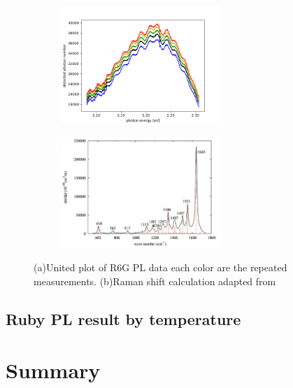 \documentclass{article}
\begin{document}
 \begin{figure}[ht]
  \centering
  \begin{subfigure}[b]{6cm}
      \centering
      \includegraphics[width=6cm]{../results/R6G_total_fig.png}
      \caption{}
  \end{subfigure}
  \hfill
  \begin{subfigure}[b]{6cm}
      \centering
      \includegraphics[width=6cm]{../results/Raman_shift.png}
      \caption{}
  \end{subfigure}
  \hfill
  \caption{(a)United plot of R6G PL data each color are the repeated measurements. (b)Raman shift calculation adapted from \cite{rhodamine_HOMO_LUMO}}
  \label{fig:R6G total fig}
\end{figure}


\subsection{Ruby PL result by temperature}
\label{result:temperature_peak_statics}  




\section{Summary}



\end{document}
